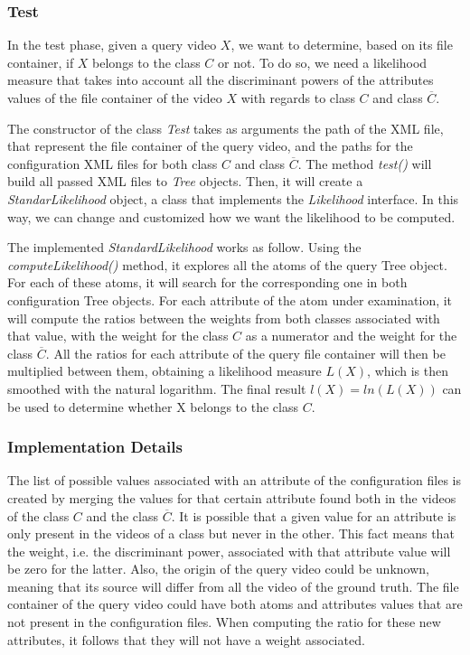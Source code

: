 \subsubsection{Test}

In the test phase, given a query video $X$, we want to determine, based on its file container, if $X$ belongs to the class $C$ or not. To do so, we need a likelihood measure that takes into account all the discriminant powers of the attributes values of the file container of the video $X$ with regards to class $C$ and class $\overline{C}$.

The constructor of the class \emph{Test} takes as arguments the path of the XML file, that represent the file container of the query video, and the paths for the configuration XML files for both class $C$ and class $\overline{C}$.
The method \emph{test()} will build all passed XML files to \emph{Tree} objects. Then, it will create a \emph{StandarLikelihood} object, a class that implements the \emph{Likelihood} interface. In this way, we can change and customized how we want the likelihood to be computed.

The implemented \emph{StandardLikelihood} works as follow. Using the \emph{computeLikelihood()} method, it explores all the atoms of the query Tree object. For each of these atoms, it will search for the corresponding one in both configuration Tree objects. For each attribute of the atom under examination, it will compute the ratios between the weights from both classes associated with that value, with the weight for the class $C$ as a numerator and the weight for the class $\overline{C}$. All the ratios for each attribute of the query file container will then be multiplied between them, obtaining a likelihood measure $L(X)$, which is then smoothed with the natural logarithm. 
The final result $l(X) = ln(L(X))$ can be used to determine whether X belongs to the class $C$.


\subsubsection{Implementation Details}

The list of possible values associated with an attribute of the configuration files is created by merging the values for that certain attribute found both in the videos of the class $C$ and the class $\overline{C}$. It is possible that a given value for an attribute is only present in the videos of a class but never in the other. This fact means that the weight, i.e. the discriminant power, associated with that attribute value will be zero for the latter.
Also, the origin of the query video could be unknown, meaning that its source will differ from all the video of the ground truth. The file container of the query video could have both atoms and attributes values that are not present in the configuration files. When computing the ratio for these new attributes, it follows that they will not have a weight associated.

